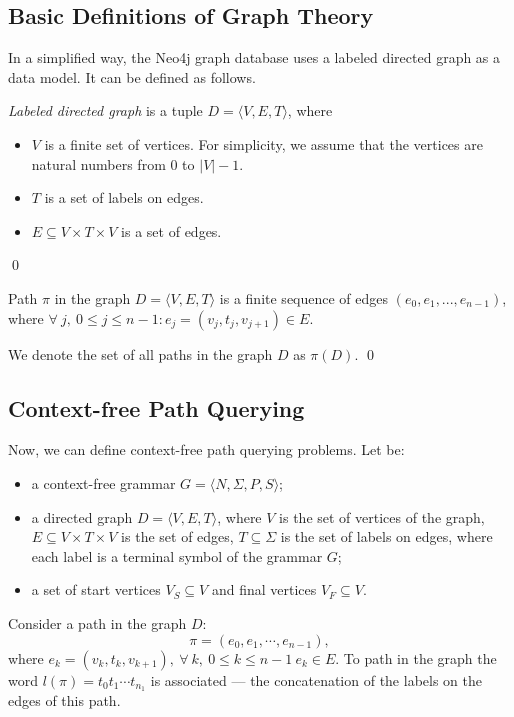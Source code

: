\subsection{Basic Definitions of Graph Theory}
In a simplified way, the Neo4j graph database uses a labeled directed graph as a data model. It can be defined as follows.

\begin{rudefinition} \emph{Labeled directed graph} is a tuple $D = \langle V, E, T \rangle$, where
\begin{itemize}
    \item $V$ is a finite set of vertices. For simplicity, we assume that the vertices are natural numbers from $0$ to $|V|-1$.
    \item $T$ is a set of labels on edges.
    \item $E \subseteq V \times T \times V$ is a set of edges.
\end{itemize} \qed
\end{rudefinition}

\begin{rudefinition}
Path $\pi$ in the graph $D = \langle V, E, T \rangle$ is a finite sequence of edges $(e_0, e_1, ..., e_{n-1})$, where $\forall~ j,~ 0 \leq j \leq n - 1: e_j=(v_j,t_j,v_{j+1}) \in E$.

We denote the set of all paths in the graph $D$ as $\pi(D)$. \qed
\end{rudefinition}

\subsection{Context-free Path Querying}
Now, we can define context-free path querying problems. Let be:
\begin{itemize}
      \item a context-free grammar $G=\langle N, \Sigma, P, S \rangle$;
      \item a directed graph $D=\langle V, E, T \rangle$, where $V$ is the set of vertices of the graph, $ E \subseteq V \times T \times V $ is the set of edges, $ T \subseteq \Sigma $ is the set of labels on edges, where each label is a terminal symbol of the grammar $G$;
\item a set of start vertices $V_S \subseteq V$ and final vertices \mbox {$V_F \subseteq V$.}
\end{itemize}

Consider a path in the graph $D$: $$\pi = (e_0, e_1, \cdots, e_{n - 1}), $$ where $ e_k = (v_{k}, t_k , v_{k+1}), ~ \forall~k,~ 0 \leq k \leq n - 1 ~e_k \in E$.
To path in the graph the word $ l(\pi) = t_0t_1 \cdots t_{n_1} $ is associated --- the concatenation of the labels on the edges of this path.

